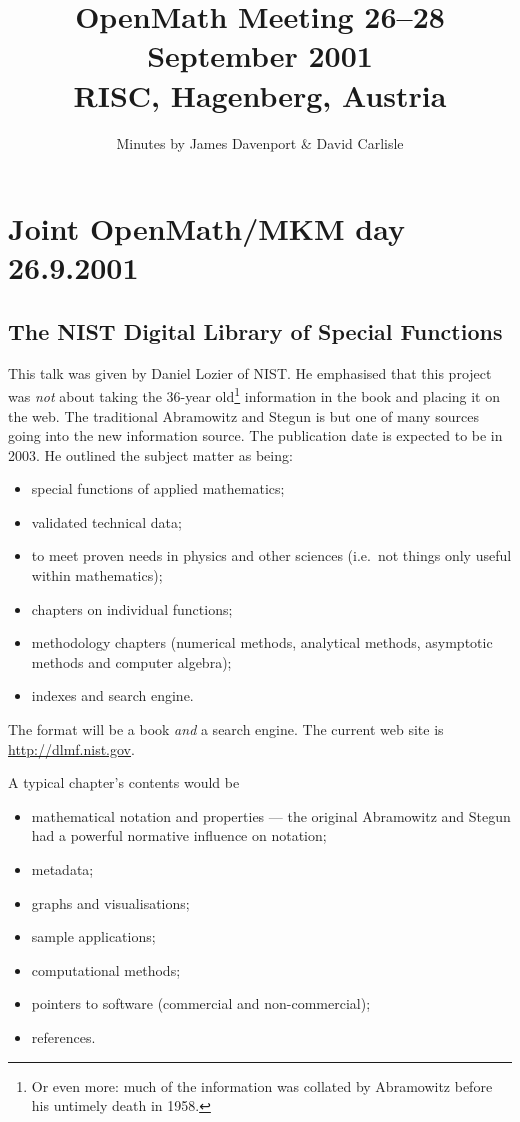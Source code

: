 \documentclass[11pt, a4paper]{article}
\begin{document}
\title{OpenMath Meeting 26--28 September 2001\\
RISC, Hagenberg, Austria\\}
\author{Minutes by James Davenport \& David Carlisle}
\maketitle
\section{Joint OpenMath/MKM day 26.9.2001}
\subsection{The NIST Digital Library of Special Functions}
This talk was given by Daniel Lozier of NIST. He emphasised that this
project was {\it not\/} about taking the 36-year old\footnote{Or even more:
much of the information was collated by Abramowitz before his untimely
death in 1958.} information in the book and placing it on the web. The
traditional Abramowitz and Stegun is but one of many sources going into the
new information source. The publication date is expected to be in 2003. He
outlined the subject matter as being:
\begin{itemize}
\item special functions of applied mathematics;
\item validated technical data;
\item to meet proven needs in physics and other sciences (i.e.~not things
only useful within mathematics);
\item chapters on individual functions;
\item methodology chapters (numerical methods, analytical methods,
asymptotic methods and computer algebra);
\item indexes and search engine.
\end{itemize}
The format will be a book {\it and\/} a search engine.
The current web site is \url{http://dlmf.nist.gov}.
\par
A typical chapter's contents would be
\begin{itemize}
\item mathematical notation and properties --- the original Abramowitz and
Stegun had a powerful normative influence on notation;
\item metadata;
\item graphs and visualisations;
\item sample applications;
\item computational methods;
\item pointers to software (commercial and non-commercial);
\item references.
\end{itemize}
\end{document}
